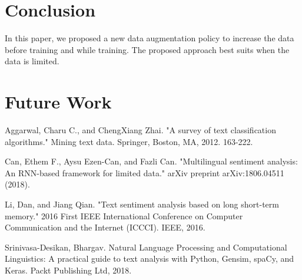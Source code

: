 \documentclass{article}
\begin{document}
\section{Conclusion}
In this paper, we proposed a new data augmentation policy to increase the data before training and while training. The proposed approach best suits when the data is limited.
\section{Future Work}
\begin{thebibliography}{10}


 Aggarwal, Charu C., and ChengXiang Zhai. "A survey of text classification algorithms." Mining text data. Springer, Boston, MA, 2012. 163-222.

 Can, Ethem F., Aysu Ezen-Can, and Fazli Can. "Multilingual sentiment analysis: An RNN-based framework for limited data." arXiv preprint arXiv:1806.04511 (2018).

 Li, Dan, and Jiang Qian. "Text sentiment analysis based on long short-term memory." 2016 First IEEE International Conference on Computer Communication and the Internet (ICCCI). IEEE, 2016.

 Srinivasa-Desikan, Bhargav. Natural Language Processing and Computational Linguistics: A practical guide to text analysis with Python, Gensim, spaCy, and Keras. Packt Publishing Ltd, 2018.
\end{thebibliography}
\end{document}
